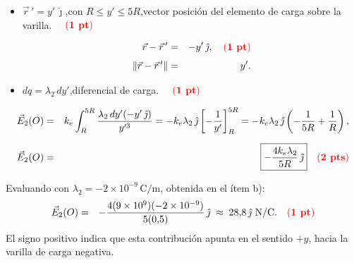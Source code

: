 \documentclass{article}
\newcommand{\ke}{k_e}
\begin{document}
\begin{enumerate}[label={\alph*)}]
\begin{itemize}[leftmargin=2em, itemsep=4pt]
  \item $\vec r\,' = y'\,\hat\jmath$,\quad con $R\le y'\le 5R$,\quad vector posición del elemento de
        carga sobre la varilla. $\quad{\color{red}(\textbf{1 pt})}$

        \begin{eqnarray*}
          \vec r-\vec r\,' &=& -y'\,\hat\jmath, \quad{\color{red}(\textbf{1 pt})}\\[4pt]
          \|\vec r-\vec r\,'\| &=& y'.
        \end{eqnarray*}

  \item $dq=\lambda_2\,dy'$,\quad diferencial de carga.
        $\quad{\color{red}(\textbf{1 pt})}$
\end{itemize}

\begin{eqnarray*}
  \vec E_2(O) &=& \ke\int_R^{5R}\frac{\lambda_2\,dy'(-y'\,\hat\jmath)}{y'^3}
      = -\ke\lambda_2\,\hat\jmath\left[-\frac1{y'}\right]_R^{5R}
      = -\ke\lambda_2\,\hat\jmath\left(-\frac1{5R}+\frac1R\right),\\[6pt]
  \vec E_2(O) &=& \boxed{-\frac{4\ke\lambda_2}{5R}\,\hat\jmath}
  \quad{\color{red}(\textbf{2 pts})}
\end{eqnarray*}

Evaluando con $\lambda_2=-2\times10^{-9}\,\text{C/m}$, obtenida en el ítem b):
\begin{eqnarray*}
  \vec E_2(O) &=& -\frac{4(9\times10^9)(-2\times10^{-9})}{5(0{,}5)}\,\hat\jmath
  \;\approx\; 28{,}8\,\hat\jmath\ \text{N/C}. \quad{\color{red}(\textbf{1 pt})}
\end{eqnarray*}
El signo positivo indica que esta contribución apunta en el sentido $+y$, hacia la varilla de carga negativa.

\end{enumerate}
\end{document}
